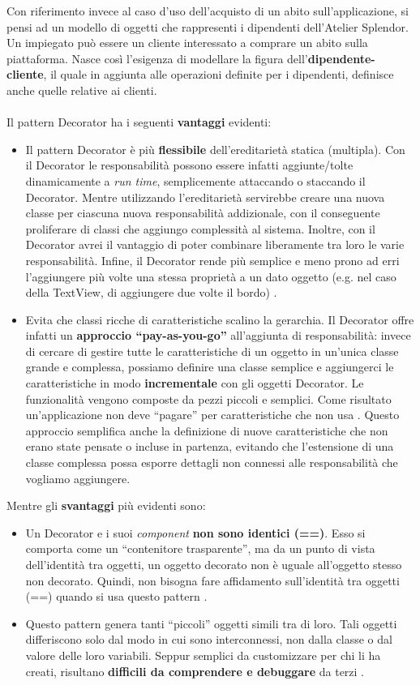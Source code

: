 \documentclass[12pt]{article}
\begin{document}
Con riferimento invece al caso d'uso dell'acquisto di un abito sull'applicazione, si pensi ad un modello di oggetti che rappresenti i dipendenti dell'Atelier Splendor. Un impiegato può essere un cliente interessato a comprare un abito sulla piattaforma. Nasce così l'esigenza di modellare la figura dell'\textbf{dipendente-cliente}, il quale in aggiunta alle operazioni definite per i dipendenti, definisce anche quelle relative ai clienti.
\\
\\
Il pattern Decorator ha i seguenti \textbf{vantaggi} evidenti:
\begin{itemize}
    \item Il pattern Decorator è più \textbf{flessibile} dell'ereditarietà statica (multipla). Con il Decorator le responsabilità possono essere infatti aggiunte/tolte dinamicamente a {\em run time}, semplicemente attaccando o staccando il Decorator. Mentre utilizzando l'ereditarietà servirebbe creare una nuova classe per ciascuna nuova responsabilità addizionale, con il conseguente proliferare di classi che aggiungo complessità al sistema. Inoltre, con il Decorator avrei il vantaggio di poter combinare liberamente tra loro le varie responsabilità. Infine, il Decorator rende più semplice e meno prono ad erri l'aggiungere più volte una stessa proprietà a un dato oggetto (e.g. nel caso della TextView, di aggiungere due volte il bordo) \cite{gof_riferimento}.
    \item Evita che classi ricche di caratteristiche scalino la gerarchia. Il Decorator offre infatti un \textbf{approccio ``pay-as-you-go''} all'aggiunta di responsabilità: invece di cercare di gestire tutte le caratteristiche di un oggetto in un'unica classe grande e complessa, possiamo definire una classe semplice e aggiungerci le caratteristiche in modo \textbf{incrementale} con gli oggetti Decorator. Le funzionalità vengono composte da pezzi piccoli e semplici.
    Come risultato un'applicazione non deve ``pagare'' per caratteristiche che non usa \cite{gof_riferimento}.
    Questo approccio semplifica anche la definizione di nuove caratteristiche che non erano state pensate o incluse in partenza, evitando che l'estensione di una classe complessa possa esporre dettagli non connessi alle responsabilità che vogliamo aggiungere.
\end{itemize}
Mentre gli \textbf{svantaggi} più evidenti sono:
\begin{itemize}
    \item Un Decorator e i suoi {\em component} \textbf{non sono identici (==)}. Esso si comporta come un ``contenitore trasparente'', ma da un punto di vista dell'identità tra oggetti, un oggetto decorato non è uguale all'oggetto stesso non decorato. Quindi, non bisogna fare affidamento sull'identità tra oggetti (==) quando si usa questo pattern \cite{gof_sunt}.
    \item Questo pattern genera tanti ``piccoli'' oggetti simili tra di loro. Tali oggetti differiscono solo dal modo in cui sono interconnessi, non dalla classe o dal valore delle loro variabili. Seppur semplici da customizzare per chi li ha creati, risultano \textbf{difficili da comprendere e debuggare} da terzi \cite{gof_riferimento}.
\end{itemize}
\end{document}
